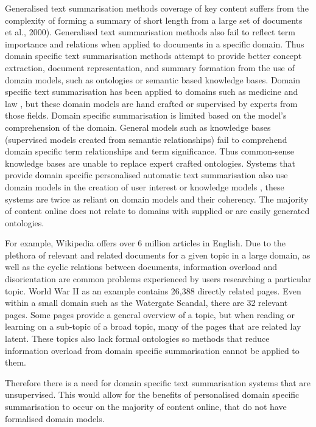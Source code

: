 Generalised text summarisation methods coverage of key content suffers from the complexity of forming a summary of short length from a large set of documents \citep{goldstein2000multi} et al., 2000). Generalised text summarisation methods also fail to reflect term importance and relations when applied to documents in a specific domain. Thus domain specific text summarisation methods attempt to provide better concept extraction, document representation, and summary formation from the use of domain models, such as ontologies or semantic based knowledge bases. Domain specific text summarisation has been applied to domains such as medicine \citep{sarker2013approach} and law \citep{galgani2012combining}, but these domain models are hand crafted or supervised by experts from those fields. Domain specific summarisation is limited based on the model’s comprehension of the domain. General models such as knowledge bases (supervised models created from semantic relationships) fail to comprehend domain specific term relationships and term significance. Thus common-sense knowledge bases are unable to replace expert crafted ontologies. Systems that provide domain specific personalised automatic text summarisation also use domain models in the creation of user interest or knowledge models \citep{ge2012ontology}, these systems are twice as reliant on domain models and their coherency. The majority of content online does not relate to domains with supplied or are easily generated ontologies.

For example, Wikipedia offers over 6 million articles in English. Due to the plethora of relevant and related documents for a given topic in a large domain, as well as the cyclic relations between documents, information overload and disorientation are common problems experienced by users researching a particular topic. World War II as an example contains 26,388 directly related pages. Even within a small domain such as the Watergate Scandal, there are 32 relevant pages. Some pages provide a general overview of a topic, but when reading or learning on a sub-topic of a broad topic, many of the pages that are related lay latent. These topics also lack formal ontologies so methods that reduce information overload from domain specific summarisation cannot be applied to them.

Therefore there is a need for domain specific text summarisation systems that are unsupervised. This would allow for the benefits of personalised domain specific summarisation to occur on the majority of content online, that do not have formalised domain models.

